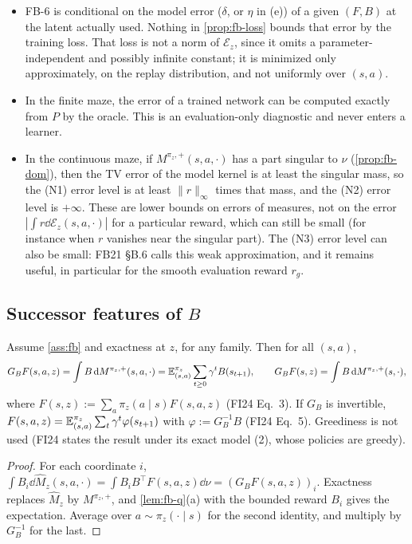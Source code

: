 \begin{remark}\label{rem:fb-approx-limits}
\leavevmode
\begin{itemize}[nosep]
\item FB-6 is conditional on the model error ($\delta$, or $\eta$ in (e)) of a given $(F,B)$ at the latent actually used.
  Nothing in \cref{prop:fb-loss} bounds that error by the training loss. That loss is not a norm of $\mathcal E_z$, since it omits a parameter-independent and possibly infinite constant; it is minimized only approximately, on the replay distribution, and not uniformly over $(s,a)$.
\item In the finite maze, the error of a trained network can be computed exactly from $P$ by the oracle. This is an evaluation-only diagnostic and never enters a learner.
\item In the continuous maze, if $M^{\pi_z,+}(s,a,\cdot)$ has a part singular to $\nu$ (\cref{prop:fb-dom}), then the TV error of the model kernel is at least the singular mass, so the (N1) error level is at least $\|r\|_\infty$ times that mass, and the (N2) error level is $+\infty$.
  These are lower bounds on errors of measures, not on the error $|\int r\dd\mathcal E_z(s,a,\cdot)|$ for a particular reward, which can still be small (for instance when $r$ vanishes near the singular part).
  The (N3) error level can also be small: FB21 \S B.6 calls this weak approximation, and it remains useful, in particular for the smooth evaluation reward $r_g$.
\end{itemize}
\end{remark}

\subsection{Successor features of \texorpdfstring{$B$}{B}}\label{sec:fb-sf}

\begin{proposition}\label{prop:fb-sf}
Assume \cref{ass:fb} and exactness at $z$, for any family. Then for all $(s,a)$,
\[
G_BF(s,a,z)=\int B\,\mathrm{d} M^{\pi_z,+}(s,a,\cdot)=\mathbb{E}^{\pi_z}_{(s,a)}\sum_{t\ge0}\gamma^tB(s_{t+1}),\qquad
G_BF(s,z)=\int B\,\mathrm{d} M^{\pi_z,+}(s,\cdot),
\]
where $F(s,z):=\sum_a\pi_z(a\mid s)F(s,a,z)$ (FI24 Eq.~3).
If $G_B$ is invertible, $F(s,a,z)=\mathbb{E}^{\pi_z}_{(s,a)}\sum_t\gamma^t\varphi(s_{t+1})$ with $\varphi:=G_B^{-1}B$ (FI24 Eq.~5).
Greediness is not used (FI24 states the result under its exact model (2), whose policies are greedy).
\end{proposition}
\begin{proof}
For each coordinate $i$, $\int B_i\dd\hat M_z(s,a,\cdot)=\int B_iB^\top F(s,a,z)\dd\nu=(G_BF(s,a,z))_i$.
Exactness replaces $\hat M_z$ by $M^{\pi_z,+}$, and \cref{lem:fb-q}(a) with the bounded reward $B_i$ gives the expectation.
Average over $a\sim\pi_z(\cdot\mid s)$ for the second identity, and multiply by $G_B^{-1}$ for the last.
\end{proof}

